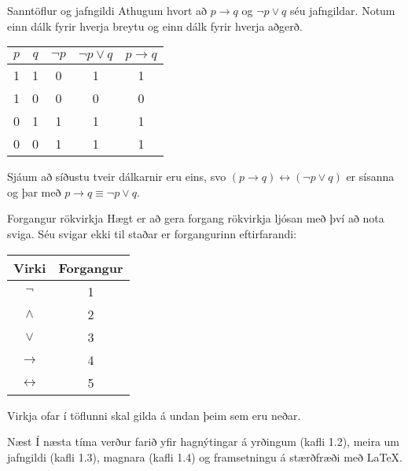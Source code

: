 \documentclass{beamer}
\begin{document}
\begin{frame}{Sanntöflur og jafngildi}
Athugum hvort að $p \to q$ og $\lnot p \lor q$ séu jafngildar. Notum einn dálk fyrir hverja breytu og einn dálk fyrir hverja aðgerð. \pause
\begin{center}
\begin{tabular}{ccccc}
\toprule
$p$&$q$&$\lnot p$&$\lnot p \lor q$&$p \to q$ \\
\midrule
1&1&0&1&1\\
1&0&0&0&0\\
0&1&1&1&1\\
0&0&1&1&1\\
\bottomrule
\end{tabular}
\end{center}
Sjáum að síðustu tveir dálkarnir eru eins, svo $(p \to q) \leftrightarrow (\lnot p \lor q)$ er sísanna og þar með $p \to q \equiv \lnot p \lor q$.
\end{frame}

\begin{frame}{Forgangur rökvirkja}
Hægt er að gera forgang rökvirkja ljósan með því að nota sviga. Séu svigar ekki til staðar er forgangurinn eftirfarandi:

\begin{center}
\begin{tabular}{cc}
\toprule
Virki&Forgangur\\
\midrule
$\lnot$&1\\
$\land$&2\\
$\lor$&3\\
$\to$&4\\
$\leftrightarrow$&5\\
\bottomrule
\end{tabular}
\end{center}

Virkja ofar í töflunni skal gilda á undan þeim sem eru neðar.
\end{frame}

\begin{frame}{Næst}
Í næsta tíma verður farið yfir hagnýtingar á yrðingum (kafli 1.2), meira um jafngildi (kafli 1.3), magnara (kafli 1.4) og framsetningu á stærðfræði með \LaTeX.
\end{frame}
\end{document}
